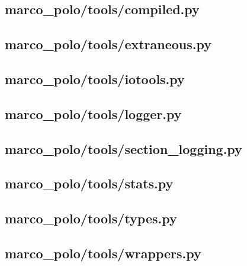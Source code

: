 \documentclass{article}
\begin{document}
\subsection[compiled.py]{marco\_polo/tools/compiled.py}

\newpage

\subsection[extraneous.py]{marco\_polo/tools/extraneous.py}

\newpage

\subsection[iotools.py]{marco\_polo/tools/iotools.py}

\newpage

\subsection[logger.py]{marco\_polo/tools/logger.py}

\newpage

\subsection[section\_logging.py]{marco\_polo/tools/section\_logging.py}

\newpage

\subsection[stats.py]{marco\_polo/tools/stats.py}

\newpage

\subsection[types.py]{marco\_polo/tools/types.py}

\newpage

\subsection[wrappers.py]{marco\_polo/tools/wrappers.py}

\newpage
\end{document}

